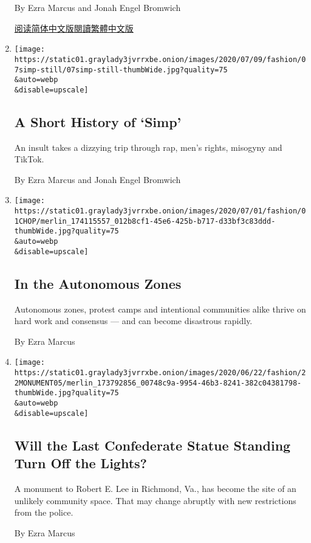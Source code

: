 \begin{enumerate}
  By Ezra Marcus and Jonah Engel Bromwich

  \href{https://cn.nytimes3xbfgragh.onion/education/20200713/harvard-students-coronavirus/}{阅读简体中文版}\href{https://cn.nytimes3xbfgragh.onion/education/20200713/harvard-students-coronavirus/zhh-hant/}{閱讀繁體中文版}
\item
  \href{/2020/07/07/style/simp-history-slang.html}{}

  \texttt{[image: https://static01.graylady3jvrrxbe.onion/images/2020/07/09/fashion/07simp-still/07simp-still-thumbWide.jpg?quality=75\\\&auto=webp\\\&disable=upscale]}

  \hypertarget{a-short-history-of-simp}{%
  \subsection{A Short History of `Simp'}\label{a-short-history-of-simp}}

  An insult takes a dizzying trip through rap, men's rights, misogyny
  and TikTok.

  By Ezra Marcus and Jonah Engel Bromwich
\item
  \href{/2020/07/01/style/autonomous-zone-anarchist-community.html}{}

  \texttt{[image: https://static01.graylady3jvrrxbe.onion/images/2020/07/01/fashion/01CHOP/merlin\_174115557\_012b8cf1-45e6-425b-b717-d33bf3c83ddd-thumbWide.jpg?quality=75\\\&auto=webp\\\&disable=upscale]}

  \hypertarget{in-the-autonomous-zones}{%
  \subsection{In the Autonomous Zones}\label{in-the-autonomous-zones}}

  Autonomous zones, protest camps and intentional communities alike
  thrive on hard work and consensus --- and can become disastrous
  rapidly.

  By Ezra Marcus
\item
  \href{/2020/06/23/style/statue-richmond-lee.html}{}

  \texttt{[image: https://static01.graylady3jvrrxbe.onion/images/2020/06/22/fashion/22MONUMENT05/merlin\_173792856\_00748c9a-9954-46b3-8241-382c04381798-thumbWide.jpg?quality=75\\\&auto=webp\\\&disable=upscale]}

  \hypertarget{will-the-last-confederate-statue-standing-turn-off-the-lights}{%
  \subsection{Will the Last Confederate Statue Standing Turn Off the
  Lights?}\label{will-the-last-confederate-statue-standing-turn-off-the-lights}}

  A monument to Robert E. Lee in Richmond, Va., has become the site of
  an unlikely community space. That may change abruptly with new
  restrictions from the police.

  By Ezra Marcus
\end{enumerate}

